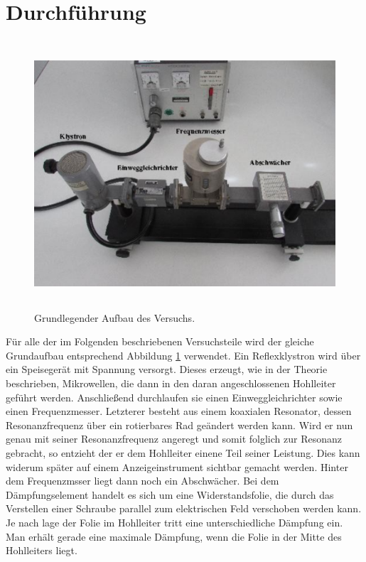 \section{Durchführung}
\label{sec:Durchführung}

\begin{figure}[H]
  \centering
  \includegraphics[height=10cm]{Grundaufbau.PNG}
  \caption{Grundlegender Aufbau des Versuchs. \cite{sample}}
  \label{fig:aufbau}
\end{figure}

Für alle der im Folgenden beschriebenen Versuchsteile wird der gleiche Grundaufbau
entsprechend Abbildung \ref{fig:aufbau} verwendet. Ein Reflexklystron wird über ein
Speisegerät mit Spannung versorgt. Dieses erzeugt, wie in der Theorie beschrieben,
Mikrowellen, die dann in den daran angeschlossenen Hohlleiter geführt werden.
Anschließend durchlaufen sie einen Einweggleichrichter sowie einen Frequenzmesser.
Letzterer besteht aus einem koaxialen Resonator, dessen Resonanzfrequenz über
ein rotierbares Rad geändert werden kann. Wird er nun genau mit seiner Resonanzfrequenz
angeregt und somit folglich zur Resonanz gebracht, so entzieht der er dem Hohlleiter
einene Teil seiner Leistung. Dies kann widerum später auf einem Anzeigeinstrument
sichtbar gemacht werden.
Hinter dem Frequenzmsser liegt dann noch ein Abschwächer. Bei dem Dämpfungselement
handelt es sich um eine Widerstandsfolie, die durch das Verstellen einer Schraube
parallel zum elektrischen Feld verschoben werden kann. Je nach lage der Folie im
Hohlleiter tritt eine unterschiedliche Dämpfung ein. Man erhält gerade eine maximale
Dämpfung, wenn die Folie in der Mitte des Hohlleiters liegt.


